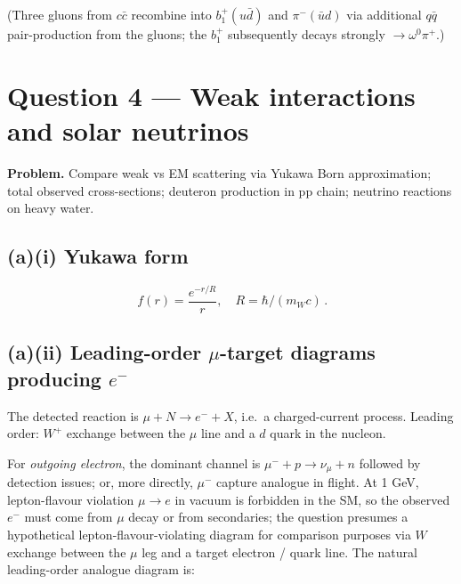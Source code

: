 \documentclass[11pt]{article}
\begin{document}
(Three gluons from $c\bar c$ recombine into $b_1^+(u\bar d)$ and $\pi^-(\bar u d)$ via additional $q\bar q$ pair-production from the gluons; the $b_1^+$ subsequently decays strongly $\to\omega^0\pi^+$.)

\section*{Question 4 --- Weak interactions and solar neutrinos}

\textbf{Problem.} Compare weak vs EM scattering via Yukawa Born approximation; total observed cross-sections; deuteron production in pp chain; neutrino reactions on heavy water.

\subsection*{(a)(i) Yukawa form}

\[ \boxed{\,f(r) = \frac{e^{-r/R}}{r},\quad R=\hbar/(m_W c)\,}. \]

\subsection*{(a)(ii) Leading-order $\mu$-target diagrams producing $e^-$}

The detected reaction is $\mu + N \to e^- + X$, i.e.\ a charged-current process. Leading order: $W^+$ exchange between the $\mu$ line and a $d$ quark in the nucleon.

\begin{center}
\end{center}

For \emph{outgoing electron}, the dominant channel is $\mu^- + p \to \nu_\mu + n$ followed by detection issues; or, more directly, $\mu^-$ capture analogue in flight. At 1 GeV, lepton-flavour violation $\mu\to e$ in vacuum is forbidden in the SM, so the observed $e^-$ must come from $\mu$ decay or from secondaries; the question presumes a hypothetical lepton-flavour-violating diagram for comparison purposes via $W$ exchange between the $\mu$ leg and a target electron / quark line. The natural leading-order analogue diagram is:
\end{document}
